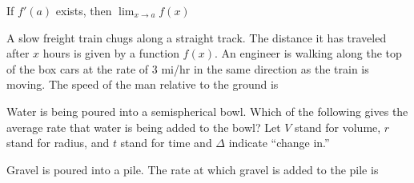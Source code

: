\documentclass{ximera}
\newcommand{\recommendation}[1]{}
\newcommand{\GoodQuestions}[1]{}
\begin{document}
\begin{problem}
  \recommendation{Vic}
  \GoodQuestions{Subject: Derivatives 7P}
  If $f'(a)$ exists, then $\lim_{x\to a}f(x)$
  \begin{multipleChoice}
  \end{multipleChoice}
\end{problem}


\begin{problem}
  \recommendation{Vic}
  \GoodQuestions{Subject: Derivatives 9Q}
  A slow freight train chugs along a straight track.  The distance it
  has traveled after $x$ hours is given by a function $f(x)$.  An
  engineer is walking along the top of the box cars at the rate of $3$
  mi/hr in the same direction as the train is moving.  The speed of
  the man relative to the ground is
  \begin{multipleChoice}
  \end{multipleChoice}
\end{problem}




\begin{problem}
  \recommendation{Elizabeth}
  Water is being poured into a semispherical bowl.  Which of the
  following gives the average rate that water is being added to the
  bowl?  Let $V$ stand for volume, $r$ stand for radius, and $t$ stand
  for time and $\Delta$ indicate ``change in.''
  \begin{multipleChoice}
  \end{multipleChoice}
\end{problem}


\begin{problem}
  \recommendation{Vic}
  \GoodQuestions{Subject: Derivative Rules 6P}
  Gravel is poured into a pile. The rate at which gravel is added to
  the pile is
\begin{multipleChoice}
\end{multipleChoice}
\end{problem}
\end{document}
